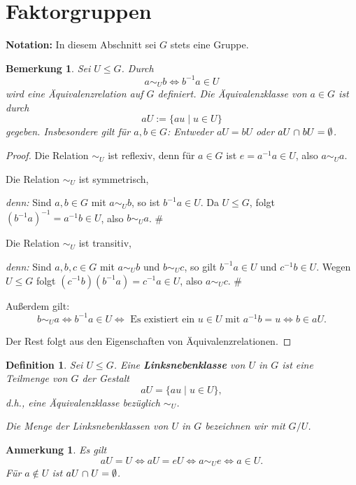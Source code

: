 \documentclass[a4paper, twoside, 11pt, ngerman]{report}
\renewcommand{\cap}{\;\rotatebox{90}{\reflectbox{\rotatebox{270}{$\cup$}}}\;}
\theoremstyle{definistyle}
\newtheorem{defini}[satz]{Definition}
\newtheorem{bem}[satz]{Bemerkung}
\newtheorem{anm}[satz]{Anmerkung}
\theoremstyle{remark}
\newenvironment{denn}%
  {\par\textit{denn:}}%
  {\hfill\#\par}
\newcommand{\defn}[1]{\textit{\bfseries #1}}
\begin{document}
\section{Faktorgruppen}\label{sec:faktorgruppen}

\textbf{Notation:} In diesem Abschnitt sei $G$ stets eine Gruppe.

\begin{bem}\label{bem:linksaequivalenz_relation}
Sei $U \leq G$. Durch
\[
a \sim_U b \iff b^{-1}a \in U
\]
wird eine Äquivalenzrelation auf $G$ definiert. Die Äquivalenzklasse von $a \in G$ ist durch
\[
aU := \{ au \mid u \in U \}
\]
gegeben. Insbesondere gilt für $a, b \in G$: Entweder $aU = bU$ oder $aU \cap bU = \emptyset$.
\end{bem}

\begin{proof}
Die Relation $\sim_U$ ist reflexiv, denn für $a \in G$ ist $e = a^{-1}a \in U$, also $a \sim_U a$.

Die Relation $\sim_U$ ist symmetrisch,
\begin{denn}
Sind $a, b \in G$ mit $a \sim_U b$, so ist $b^{-1}a \in U$. Da $U \leq G$, folgt $(b^{-1}a)^{-1} = a^{-1}b \in U$, also $b \sim_U a$.
\end{denn}
Die Relation $\sim_U$ ist transitiv,
\begin{denn}
Sind $a, b, c \in G$ mit $a \sim_U b$ und $b \sim_U c$, so gilt $b^{-1}a \in U$ und $c^{-1}b \in U$. Wegen $U \leq G$ folgt $(c^{-1}b)(b^{-1}a) = c^{-1}a \in U$, also $a \sim_U c$.
\end{denn}
Außerdem gilt: \[b \sim_U a \iff b^{-1}a \in U \iff \text{ Es existiert ein } u \in U \text{ mit } a^{-1}b = u \iff b \in aU.\]

Der Rest folgt aus den Eigenschaften von Äquivalenzrelationen.
\end{proof}

\begin{defini}\label{def:linksklasse}
Sei $U \leq G$. Eine \defn{Linksnebenklasse} von $U$ in $G$ ist eine Teilmenge von $G$ der Gestalt
\[
aU = \{ au \mid u \in U \},
\]
d.h., eine Äquivalenzklasse bezüglich $\sim_U$.

Die Menge der Linksnebenklassen von $U$ in $G$ bezeichnen wir mit $G / U$.
\end{defini}

\begin{anm}\label{anm:eigenschaften_nebenklassen}
Es gilt \[aU = U \iff aU = eU \iff a \sim_U e \iff a \in U.\] Für $a \notin U$ ist $aU \cap U = \emptyset$.
\end{anm}
\end{document}

